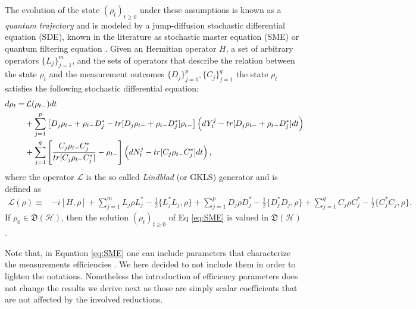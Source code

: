\documentclass[aihp,12pt]{imsart}
\newcommand{\Hc}{\mathcal{H}}
\newcommand{\Lc}{\mathcal{L}}
\newcommand{\Df}{\mathfrak{D}}
\newcommand{\tr}{{\rm tr}}
\theoremstyle{theorem}
\theoremstyle{definition}
\theoremstyle{remark}
\begin{document}
The evolution of the state \((\rho_t)_{t\geq0}\) under these assumptions is known as a {\em quantum trajectory} and is modeled by a jump-diffusion stochastic differential equation (SDE), known in the literature as stochastic master equation (SME) \cite{barchielli2009quantum} or quantum filtering equation \cite{BELAVKIN1992171,bouten2007introduction}. Given an Hermitian operator $H$, a set of arbitrary operators $\{L_j\}_{j=1}^m$, and the sets of operators that describe the relation between the state $\rho_t$ and the measurement outcomes $\{D_j\}_{j=1}^p,\{C_j\}_{j=1}^q$ the state $\rho_t$ satisfies the following stochastic differential equation:
\begin{equation}
\begin{split}
    d\rho_t = &\, \Lc(\rho_{t-}) dt\\& + \sum_{j=1}^{p} \left[ D_j\rho_{t-}+\rho_{t-} D_j^* -\tr[D_j\rho_{t-}+\rho_{t-} D_j^*]\rho_{t-} \right] \left(dY_t^j-\tr[D_j\rho_{t-}+\rho_{t-} D_j^*] dt\right)\\ & +  \sum_{j=1}^{q}\left[\frac{C_j\rho_{t-} C_j^*}{\tr[C_j\rho_{t-} C_j^*]}-\rho_{t-}\right]\left(dN_t^j-\tr[C_j\rho_{t-} C_j^*]dt\right),
\end{split}
    \label{eq:SME}
\end{equation}
where the operator $\mathcal L$ is the so called \emph{Lindblad} (or GKLS) generator and is defined as
\begin{equation}
    \begin{split}
        \Lc(\rho) \equiv&  -i[H,\rho] + \sum_{j=1}^m L_j\rho L_j^*-\frac{1}{2}\{L_j^* L_j,\rho\} + \sum_{j=1}^p D_j\rho D_j^*-\frac{1}{2}\{D_j^* D_j,\rho\} + \sum_{j=1}^q C_j\rho C_j^*-\frac{1}{2}\{C_j^* C_j,\rho\}.
    \end{split}
\end{equation}
If $\rho_0\in \Df(\Hc)$, then the solution $(\rho_t)_{t\geq 0}$ of Eq \eqref{eq:SME} is valued in $\Df(\Hc)$ \cite{pellegrini2010markov}. 

Note that, in Equation \eqref{eq:SME} one can include parameters that characterize the measurements efficiencies \cite{1amini2014stability}. We here decided to not include them in order to lighten the notations. Nonetheless the introduction of efficiency parameters does not change the results we derive next as those are simply scalar coefficients that are not affected by the involved reductions. 
\bigskip
\end{document}

